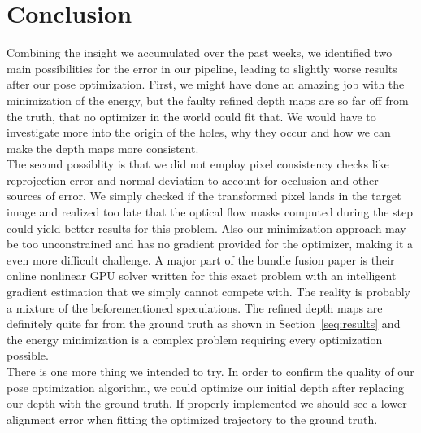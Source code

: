 \chapter{Conclusion}
    Combining the insight we accumulated over the past weeks, we identified two main possibilities for the error in our pipeline, leading to slightly worse results after our pose optimization.
    First, we might have done an amazing job with the minimization of the energy, but the faulty refined depth maps are so far off from the truth, that no optimizer in the world could fit that.
    We would have to investigate more into the origin of the holes, why they occur and how we can make the depth maps more consistent.\\
    The second possiblity is that we did not employ pixel consistency checks like reprojection error and normal deviation to account for occlusion and other sources of error.
    We simply checked if the transformed pixel lands in the target image and realized too late that the optical flow masks computed during the  step could yield better results for this problem.
    Also our minimization approach may be too unconstrained and has no gradient provided for the optimizer, making it a even more difficult challenge.
    A major part of the bundle fusion paper is their online nonlinear GPU solver written for this exact problem with an intelligent gradient estimation that we simply cannot compete with.
    The reality is probably a mixture of the beforementioned speculations.
    The refined depth maps are definitely quite far from the ground truth as shown in Section~\ref{seq:results} and the energy minimization is a complex problem requiring every optimization possible.\\
    There is one more thing we intended to try.
    In order to confirm the quality of our pose optimization algorithm, we could optimize our initial depth after replacing our depth with the ground truth.
    If properly implemented we should see a lower alignment error when fitting the optimized trajectory to the ground truth.